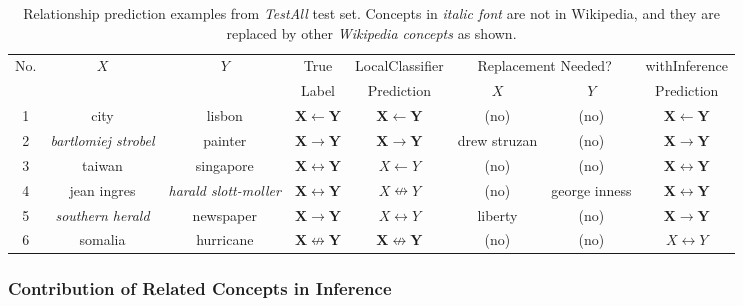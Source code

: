 \begin{table}[!t]
  \begin{center}
    \begin{tabular}{|c|c|c|c|c|c|c|c|}
      \hline
      No.  &  $X$             &  $Y$          &  True    &  LocalClassifier       &  \multicolumn{2}{|c|}{Replacement Needed?}  &  withInference \\ \cline{6-7}
      &                  &               &  Label   &  Prediction                   &  $X$                  &  $Y$                     &  Prediction           \\
      \hline
      \hline
      1&city                    &lisbon                   &$\mathbf{X \leftarrow Y}$      &$\mathbf{X \leftarrow Y}$      &(no)        &(no)         &$\mathbf{X \leftarrow Y}$  \\
      2&{\em bartlomiej strobel}&painter                  &$\mathbf{X \rightarrow Y}$     &$\mathbf{X \rightarrow Y}$     &drew struzan&(no)         &$\mathbf{X \rightarrow Y}$ \\
      3&taiwan                  &singapore                &$\mathbf{X \leftrightarrow Y}$ &$X \leftarrow Y$               &(no)        &(no)         &$\mathbf{X \leftrightarrow Y}$ \\
      4&jean ingres             &{\em harald slott-moller}&$\mathbf{X \leftrightarrow Y}$ &$X \nleftrightarrow Y$         &(no)        &george inness&$\mathbf{X \leftrightarrow Y}$ \\
      5&{\em southern herald}   &newspaper                &$\mathbf{X \rightarrow Y}$     &$X \leftrightarrow Y$          &liberty     &(no)         &$\mathbf{X \rightarrow Y}$  \\
      6&somalia                 &hurricane                &$\mathbf{X \nleftrightarrow Y}$&$\mathbf{X \nleftrightarrow Y}$&(no)        &(no)         &$X \leftrightarrow Y$  \\
      \hline
    \end{tabular}
    \caption{Relationship prediction examples from {\em TestAll} test
      set. Concepts in {\em italic font} are not in Wikipedia, and
      they are replaced by other {\em Wikipedia concepts} as shown.}
    \label{table:pre-examples}
  \end{center}
\end{table}

\subsubsection{Contribution of Related Concepts in Inference}
\label{sec:contr-relat-conc}

